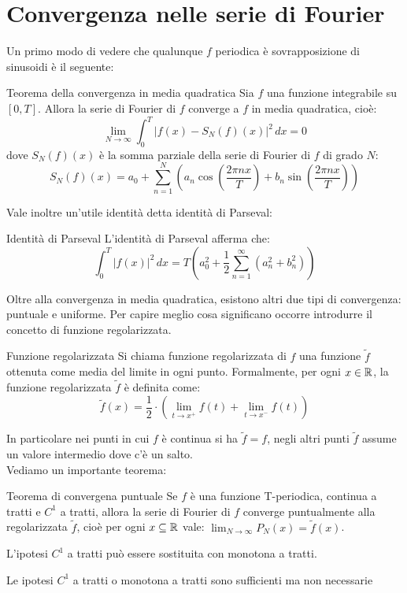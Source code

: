 \section{Convergenza nelle serie di Fourier}
Un primo modo di vedere che qualunque $f$ periodica è sovrapposizione di sinusoidi è il seguente:
\begin{teorema}{Teorema della convergenza in media quadratica}
  Sia $f$ una funzione integrabile su $[0, T]$. Allora la serie di Fourier di $f$ converge a $f$ in media quadratica, cioè:
  $$
  \lim_{N \to \infty} \int_{0}^{T} \left| f(x) - S_N(f)(x) \right|^2 \, dx = 0
  $$
  dove $S_N(f)(x)$ è la somma parziale della serie di Fourier di $f$ di grado $N$:
  $$
  S_N(f)(x) = a_0 + \sum_{n=1}^{N} \left( a_n \cos\left(\frac{2\pi nx}{T}\right) + b_n \sin\left(\frac{2\pi nx}{T}\right) \right)
  $$
\end{teorema}
Vale inoltre un'utile identità detta identità di Parseval:
\begin{osservazione}{Identità di Parseval}
  L'identità di Parseval afferma che:
  $$
  \int_{0}^{T} \left| f(x) \right|^2 \, dx = T \left( a_0^2 + \frac{1}{2} \sum_{n=1}^{\infty} \left( a_n^2 + b_n^2 \right) \right)
  $$
\end{osservazione}
Oltre alla convergenza in media quadratica, esistono altri due tipi di convergenza: puntuale e uniforme. Per capire meglio cosa significano occorre introdurre il concetto di funzione regolarizzata.
\begin{definizione}{Funzione regolarizzata}
  Si chiama funzione regolarizzata di $f$ una funzione $\tilde{f}$ ottenuta come media del limite in ogni punto. Formalmente, per ogni $x \in \mathbb{R}$, la funzione regolarizzata $\tilde{f}$ è definita come:
  $$
  \tilde{f}(x) = \frac{1}{2}\cdot (\lim_{t \to x^+} f(t)+\lim_{t \to x^-} f(t))
  $$

\end{definizione}
In particolare nei punti in cui $f$ è continua si ha $\tilde{f}=f$, negli altri punti $\tilde{f}$ assume un valore intermedio dove c'è un salto.\\
Vediamo un importante teorema:
\begin{teorema}{Teorema di convergena puntuale}
  Se $f$ è una funzione T-periodica, continua a tratti e $C^1$ a tratti, allora la serie di Fourier di $f$ converge puntualmente alla regolarizzata $\tilde{f}$, cioè per ogni $x \subseteq \mathbb{R}$ vale: $\lim_{N \to \infty} P_N(x) = \tilde{f}(x)$.
\end{teorema}

L'ipotesi $C^1$ a tratti può essere sostituita con monotona a tratti.
\begin{osservazione}{}
  Le ipotesi $C^1$ a tratti o monotona a tratti sono sufficienti ma non necessarie
\end{osservazione}

